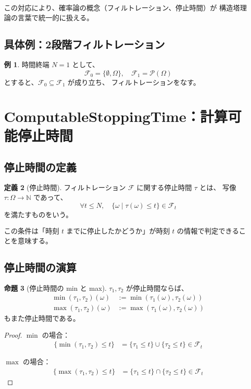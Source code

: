 \documentclass[a4paper,12pt]{ltjsarticle}
\theoremstyle{definition}
\newtheorem{definition}{定義}[section]
\newtheorem{proposition}[definition]{命題}
\newtheorem{example}[definition]{例}
\begin{document}
この対応により、確率論の概念（フィルトレーション、停止時間）が
構造塔理論の言葉で統一的に扱える。

\subsection{具体例：2段階フィルトレーション}

\begin{example}
時間終端 $N = 1$ として、
\[
\mathcal{F}_0 = \{\emptyset, \Omega\}, \quad \mathcal{F}_1 = \mathcal{P}(\Omega)
\]
とすると、$\mathcal{F}_0 \subseteq \mathcal{F}_1$ が成り立ち、
フィルトレーションをなす。
\end{example}

\section{ComputableStoppingTime：計算可能停止時間}

\subsection{停止時間の定義}

\begin{definition}[停止時間]
フィルトレーション $\mathcal{F}$ に関する停止時間 $\tau$ とは、
写像 $\tau : \Omega \to \mathbb{N}$ であって、
\[
\forall t \leq N, \quad \{\omega \mid \tau(\omega) \leq t\} \in \mathcal{F}_t
\]
を満たすものをいう。
\end{definition}

この条件は「時刻 $t$ までに停止したかどうか」が時刻 $t$ の情報で判定できることを意味する。

\subsection{停止時間の演算}

\begin{proposition}[停止時間の min と max]
$\tau_1, \tau_2$ が停止時間ならば、
\begin{align*}
\min(\tau_1, \tau_2)(\omega) &:= \min(\tau_1(\omega), \tau_2(\omega)) \\
\max(\tau_1, \tau_2)(\omega) &:= \max(\tau_1(\omega), \tau_2(\omega))
\end{align*}
もまた停止時間である。
\end{proposition}

\begin{proof}
$\min$ の場合：
\begin{align*}
\{\min(\tau_1, \tau_2) \leq t\} &= \{\tau_1 \leq t\} \cup \{\tau_2 \leq t\} \in \mathcal{F}_t
\end{align*}

$\max$ の場合：
\begin{align*}
\{\max(\tau_1, \tau_2) \leq t\} &= \{\tau_1 \leq t\} \cap \{\tau_2 \leq t\} \in \mathcal{F}_t
\end{align*}
\end{proof}
\end{document}
